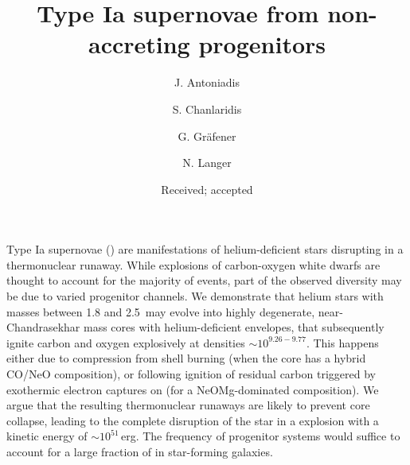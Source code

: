 \documentclass{aa}
\begin{document}
\title{Type Ia supernovae from non-accreting progenitors}
 









   \author{J. Antoniadis
   \and S. Chanlaridis
   \and G. Gr\"{a}fener
   \and N. Langer
          }


   \date{Received; accepted}




\abstract 
{Type Ia supernovae (\ias) are  manifestations of helium-deficient stars disrupting in a 
thermonuclear runaway. While explosions of carbon-oxygen white dwarfs are 
thought to account for the majority of events, part of the observed diversity 
may be due to varied progenitor channels. We demonstrate that 
helium stars with masses between 1.8 and 2.5\msun\ may evolve 
into highly degenerate, near-Chandrasekhar mass cores with 
helium-deficient envelopes, that subsequently  ignite carbon and oxygen explosively at densities $\sim10^{9.26-9.77}$\denu. This happens either due to compression from 
shell burning (when the core has a hybrid CO/NeO composition), 
or following ignition of residual carbon triggered by  
exothermic electron captures on  (for a 
NeOMg-dominated  composition). We argue that the resulting 
thermonuclear runaways are likely to prevent core collapse, 
leading to the complete disruption of the star in a \ia 
explosion with a kinetic energy of $\sim 10^{51}$\,erg. 
The frequency of progenitor systems would suffice to account  
for a large fraction of \ias in star-forming  galaxies. }
\end{document}
